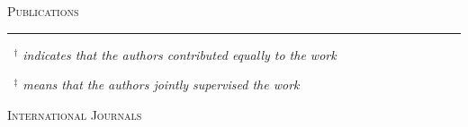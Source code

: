 \documentclass[a4paper,10pt]{article}
\newcommand{\mediumtitle}[1]{
	\vspace{0.2cm}
	{\noindent
	\Large \textsc{#1}\\[-2ex]
	\hrule
	\vspace{0.2cm}}
}
\newcommand{\smalltitle}[1]{
	\vspace{0.1cm}
	{\noindent 
	\large \textsc{#1}}
	\vspace{0.1cm}
}
\begin{document}

\mediumtitle{Publications}

%
%
%

{\small 
\noindent \emph{~$^{\textbf{$\dag $}}$ indicates that the authors contributed equally to the work}

\noindent \emph{~$^{\textbf{$\ddag $}}$ means that the authors jointly supervised the work}
}

\vspace{0.4cm}

\smalltitle{International Journals}
\end{document}
